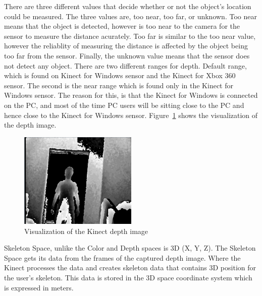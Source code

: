 There are three different values that decide whether or not the object's location could be measured. The three values are, too near, too far, or unknown. Too near means that the object is detected, however is too near to the camera for the sensor to measure the distance acurately. Too far is similar to the too near value, however the reliablity of measuring the distance is affected by the object being too far from the sensor. Finally, the unknown value means that the sensor does not detect any object. There are two different ranges for depth. Default range, which is found on Kinect for Windows sensor and the Kinect for Xbox 360 sensor. The second is the near range which is found only in the Kinect for Windows sensor. The reason for this, is that the Kinect for Windows is connected on the PC, and most of the time PC users will be sitting close to the PC and hence close to the Kinect for Windows sensor. Figure~\ref{depth} shows the visualization of the depth image.

\begin{figure}[!htbp]
\centering
\includegraphics[width=0.5\textwidth]{images/depth.png}
\caption{Visualization of the Kinect depth image}
\label{depth}
\end{figure}

Skeleton Space, unlike the Color and Depth spaces is 3D (X, Y, Z). The Skeleton Space gets its data from the frames of the captured depth image. Where the Kinect processes the data and creates skeleton data that contains 3D position for the user's skeleton. This data is stored in the 3D space coordinate system which is expressed in meters.

